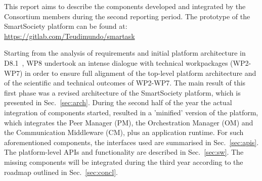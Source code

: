 This report aims to describe the components developed and integrated by the Consortium members during the second reporting period. The prototype of the SmartSociety platform can be found at:
\url{https://gitlab.com/Teudimundo/smartask}

Starting from the analysis of requirements and initial platform architecture in D8.1~\cite{D8.1}, WP8 undertook an intense dialogue with technical workpackages (WP2-WP7) in order to ensure full alignment of the top-level platform architecture and of the scientific and technical outcomes of WP2-WP7. The main result of this first phase was a revised architecture of the SmartSociety platform, which is presented in Sec.~\ref{sec:arch}. During the second half of the year the actual integration of components started, resulted in a 'minified' version of the platform, which integrates the Peer Manager (PM), the Orchestration Manager (OM) and the Communication Middleware (CM), plus an application runtime. For such aforementioned components, the interfaces used are summarised in Sec.~\ref{sec:apis}. The platform-level APIs and functionality are described in Sec.~\ref{sec:sw}. The missing components will be integrated during the third year according to the roadmap outlined in Sec.~\ref{sec:concl}.




